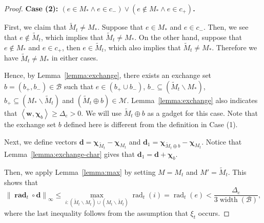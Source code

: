 \documentclass{article}
\newcommand{\M}{\mathcal M}
\newcommand{\B}{\mathcal B}
\newcommand{\del}{\backslash}
\DeclareMathOperator{\rank}{width}
\DeclareMathOperator{\rad}{rad}
\newcommand{\inn}[1]{\left\langle #1 \right\rangle}
\newcommand{\nor}[1]{\left\|#1\right\|}
\renewcommand{\vec}[1]{\boldsymbol{#1}}
\renewcommand{\odot}{\circ}
\begin{document}
\begin{proof}
\textbf{Case (2): $(e \in M_* \wedge e\in c_-) \vee (e \not \in M_* \wedge e\in c_+)$.}

First, we claim that $\tilde M_t \not= M_*$.
Suppose that $e\in M_*$ and $e\in c_-$.
Then, we see that $e\not\in \tilde M_t$, which implies that $\tilde M_t\not=M_*$.
On the other hand, suppose that $e\not \in M_*$ and $e\in c_+$, then $e\in \tilde M_t$, which also implies that $\tilde M_t\not= M_*$.
Therefore we have $\tilde M_t\not=M_*$ in either cases.


Hence, by Lemma~\ref{lemma:exchange}, there exists an exchange set $b=(b_+,b_-)\in \B$ such that 
$e \in (b_+ \cup b_-)$, $b_-\subseteq  (\tilde M_t \del M_*)$, $b_+ \subseteq (M_* \del \tilde M_t)$ and
$(\tilde M_t \oplus b) \in \M$.
Lemma~\ref{lemma:exchange} also indicates that $\inn{\vec w, \vec \chi_b} \ge \Delta_e > 0$.
We will use $\tilde M_t \oplus b$ as a gadget for this case.
Note that the exchange set $b$ defined here is different from the definition in Case (1).

Next, we define vectors $\vec d = \vec \chi_{\tilde M_t} - \vec \chi_{M_t}$ and $\vec d_1 = \vec\chi_{\tilde M_t\oplus b}-\vec\chi_{M_t}$.
Notice that Lemma~\ref{lemma:exchange-char} gives that $\vec d_1= \vec d+\vec \chi_b$.

Then, we apply Lemma~\ref{lemma:max} by setting $M = M_t$ and $M' = \tilde M_t$. 
This shows that 
\begin{equation}
\nor{\vec \rad_t\odot \vec d}_\infty \le \max_{i: (\tilde M_t \del M_t)\cup (M_t\del \tilde M_t)} \rad_t(i) = \rad_t(e) < \frac{\Delta_e}{3\rank(\B)},
\label{eq:u-c-2-0}
\end{equation}
where the last inequality follows from the assumption that $\xi_t$ occurs.


\end{proof}
\end{document}
